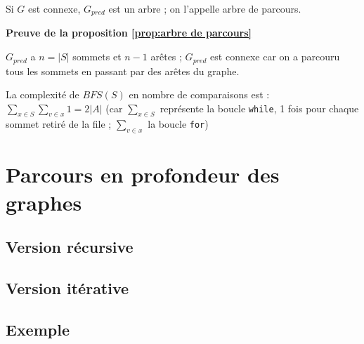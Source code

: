 \begin{proposition}\label{prop:arbre de parcours}
Si $G$ est connexe, $G_{pred}$ est un arbre ; on l'appelle arbre de parcours.
\end{proposition}

\textbf{\sffamily\small Preuve de la proposition \ref{prop:arbre de parcours}}

$G_{pred}$ a $n = \vert S \vert$ sommets et $n - 1$ arêtes ; $G_{pred}$ est connexe car on a parcouru tous les sommets en passant par des arêtes du graphe.

\begin{proposition}
La complexité de $BFS(S)$ en nombre de comparaisons est : $\sum\limits_{x \in S} \sum\limits_{v \in x} 1 = 2 \vert A \vert$ (car $\sum\limits_{x \in S}$ représente la boucle \texttt{while}, 1 fois pour chaque sommet retiré de la file ; $\sum\limits_{v \in x}$ la boucle \texttt{for})
\end{proposition}

\newpage

\section{Parcours en profondeur des graphes}

\subsection{Version récursive}



\subsection{Version itérative}



\subsection*{Exemple}

